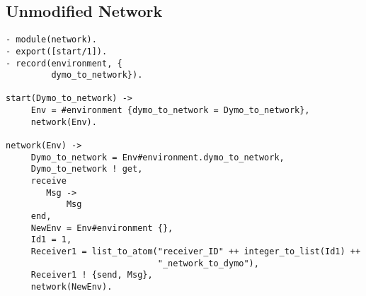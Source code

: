 \subsection*{Unmodified Network}

\footnotesize
\begin{verbatim}
- module(network).
- export([start/1]).
- record(environment, {
         dymo_to_network}).

start(Dymo_to_network) -> 
     Env = #environment {dymo_to_network = Dymo_to_network},
     network(Env).

network(Env) -> 
     Dymo_to_network = Env#environment.dymo_to_network,
     Dymo_to_network ! get,
     receive 
        Msg -> 
            Msg
     end,
     NewEnv = Env#environment {},
     Id1 = 1,
     Receiver1 = list_to_atom("receiver_ID" ++ integer_to_list(Id1) ++
                              "_network_to_dymo"),
     Receiver1 ! {send, Msg},
     network(NewEnv).
\end{verbatim}
\normalsize